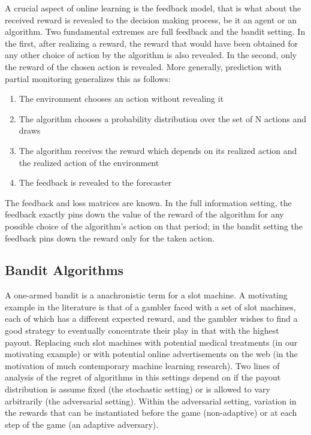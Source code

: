 A crucial aspect of online learning is the feedback model, that is what about the received reward is revealed to the decision making process, be it an agent or an algorithm. Two fundamental extremes are full feedback and the bandit setting. In the first, after realizing a reward, the reward that would have been obtained for any other choice of action by the algorithm is also revealed. In the second, only the reward of the chosen action is revealed. More generally, prediction with partial monitoring \cite{cesa2006regret} generalizes this as follows:

\begin{enumerate}
\item The environment chooses an action without revealing it
\item The algorithm chooses a probability distribution over the set of N actions and draws
\item The algorithm receives the reward which depends on its realized action and the realized action of the environment
\item The feedback is revealed to the forecaster
\end{enumerate}

The feedback and loss matrices are known. In the full information setting, the feedback exactly pins down the value of the reward of the algorithm for any possible choice of the algorithm's action on that period; in the bandit setting the feedback pins down the reward only for the taken action.


\subsection{Bandit Algorithms}

A one-armed bandit is a anachronistic term for a slot machine. A motivating example in the literature is that of a gambler faced with a set of slot machines, each of which has a different expected reward, and the gambler wishes to find a good strategy to eventually concentrate their play in that with the highest payout. Replacing such slot machines with potential medical treatments (in our motivating example) or with potential online advertisements on the web (in the motivation of much contemporary machine learning research). Two lines of analysis of the regret of algorithms in this settings depend on if the payout distribution is assume fixed (the stochastic setting) or is allowed to vary arbitrarily (the adversarial setting). Within the adversarial setting,  variation in the rewards that can be instantiated before the game (non-adaptive) or at each step of the game (an adaptive adversary). 

